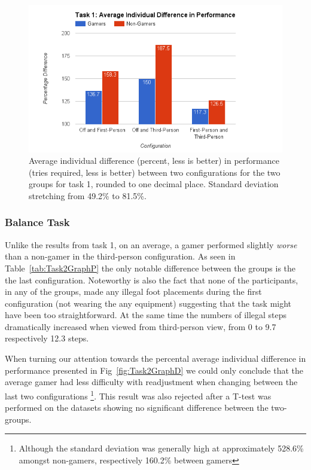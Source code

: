 \documentclass[runningheads,a4paper,oribibl]{llncs}
\begin{document}
\begin{figure}
   \centering
   \includegraphics[width=\textwidth]{ExternalMaterial/Task1GraphD}
   \caption{Average individual difference (percent, less is better) in performance (tries required, less is better) between two configurations for the two groups for task 1, rounded to one decimal place. Standard deviation stretching from 49.2\% to 81.5\%.} \label{fig:Task1GraphD}
\end{figure}












\subsubsection{Balance Task}
Unlike the results from task 1, on an average, a gamer performed slightly \emph{worse} than a non-gamer in the third-person configuration. As seen in Table~\ref{tab:Task2GraphP} the only notable difference between the groups is the the last configuration. Noteworthy is also the fact that none of the participants, in any of the groups, made any illegal foot placements during the first configuration (not wearing the any equipment) suggesting that the task might have been too straightforward. At the same time the numbers of illegal steps dramatically increased when viewed from third-person view, from 0 to 9.7 respectively 12.3 steps.  

When turning our attention towards the percental average individual difference in performance presented in Fig~\ref{fig:Task2GraphD} we could only conclude that the average gamer had less difficulty with readjustment when changing between the last two configurations \footnote{Although the standard deviation was generally high at approximately 528.6\% amongst non-gamers, respectively 160.2\% between gamers}. This result was also rejected after a T-test was performed on the datasets showing no significant difference between the two-groups.
\end{document}
